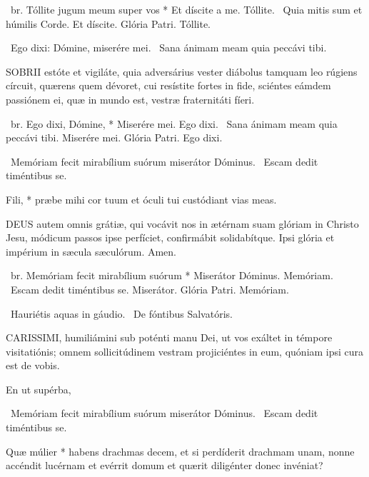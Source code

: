 \R\ br. Tóllite jugum meum super vos * Et díscite a me. Tóllite. \V\ Quia mitis sum et húmilis Corde. Et díscite. Glória Patri. Tóllite.

\V\ Ego dixi: Dómine, miserére mei. \R\ Sana ánimam meam quia peccávi tibi.



\lettrine[lines=2]{S}{OBRII} estóte et vigiláte, quia adversárius vester diábolus tamquam leo rúgiens círcuit, quærens quem dévoret, cui resístite fortes in fide, sciéntes eámdem passiónem ei, quæ in mundo est, vestræ fraternitáti fíeri.

\R\ br. Ego dixi, Dómine, * Miserére mei. Ego dixi. \V\ Sana ánimam meam quia peccávi tibi. Miserére mei. Glória Patri. Ego dixi.

\V\ Memóriam fecit mirabílium suórum miserátor Dóminus. \R\ Escam dedit timéntibus se.


 Fili, * præbe mihi cor tuum et óculi tui custódiant vias meas.


\lettrine[lines=2]{D}{EUS} autem omnis grátiæ, qui vocávit nos in ætérnam suam glóriam in Christo Jesu, módicum passos ipse perfíciet, confirmábit solidabítque. Ipsi glória et impérium in sæcula sæculórum. Amen.

\R\ br. Memóriam fecit mirabílium suórum * Miserátor Dóminus. Memóriam. \V\ Escam dedit timéntibus se. Miserátor. Glória Patri. Memóriam.

\V\ Hauriétis aquas in gáudio. \R\ De fóntibus Salvatóris.




\lettrine[lines=2]{C}{ARISSIMI}, humiliámini sub poténti manu Dei, ut vos exáltet in témpore visitatiónis; omnem sollicitúdinem vestram projiciéntes in eum, quóniam ipsi cura est de vobis.

 En ut supérba, 

\V\ Memóriam fecit mirabílium suórum miserátor Dóminus. \R\ Escam dedit timéntibus se.

 Quæ múlier * habens drachmas decem, et si perdíderit drachmam unam, nonne accéndit lucérnam et evérrit domum et quærit diligénter donec invéniat?


